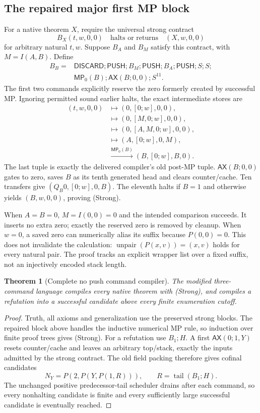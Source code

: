 \documentclass[11pt]{article}
\newcommand{\MP}{\mathsf{MP}_0}
\newcommand{\AX}{\mathsf{AX}}
\newcommand{\PUSH}{\mathsf{PUSH}}
\newcommand{\DISCARD}{\mathsf{DISCARD}}
\newtheorem{theorem}{Theorem}
\begin{document}
\subsection*{The repaired major first MP block}
For a native theorem $X$, require the universal strong contract
\[
 B_X(t,w,0,0)\quad\text{halts or returns}\quad(X,w,0,0)
 \tag{Strong}
\]
for arbitrary natural $t,w$. Suppose $B_A$ and $B_M$ satisfy this contract, with $M=I(A,B)$. Define
\[
 \begin{split}
 B_B={}&\DISCARD;\PUSH;B_M;\PUSH;B_A;\PUSH;S;S;\\
       &\MP(B);\AX(B;0,0);S^{11}.
 \end{split}
\]
The first two commands explicitly reserve the zero formerly created by successful MP. Ignoring permitted sound earlier halts, the exact intermediate stores are
\begin{align*}
 (t,w,0,0)&\longmapsto(0,[0;w],0,0),\\
 &\longmapsto(0,[M,0;w],0,0),\\
 &\longmapsto(0,[A,M,0;w],0,0),\\
 &\longmapsto(A,[0;w],0,M),\\
 &\xrightarrow{\MP(B)}(B,[0;w],B,0).
\end{align*}
The last tuple is exactly the delivered compiler's old post-MP tuple. $\AX(B;0,0)$ gates to zero, saves $B$ as its tenth generated head and clears counter/cache. Ten transfers give $(Q_B0,[0;w],0,B)$. The eleventh halts if $B=1$ and otherwise yields $(B,w,0,0)$, proving (Strong).

When $A=B=0$, $M=I(0,0)=0$ and the intended comparison succeeds. It inserts no extra zero; exactly the reserved zero is removed by cleanup. When $w=0$, a saved zero can numerically alias its suffix because $P(0,0)=0$. This does not invalidate the calculation: $\operatorname{unpair}(P(x,v))=(x,v)$ holds for every natural pair. The proof tracks an explicit wrapper list over a fixed suffix, not an injectively encoded stack length.

\begin{theorem}[Complete no push command compiler]
The modified three-command language compiles every native theorem with (Strong), and compiles a refutation into a successful candidate above every finite enumeration cutoff.
\end{theorem}
\begin{proof}
Truth, all axioms and generalization use the preserved strong blocks. The repaired block above handles the inductive numerical MP rule, so induction over finite proof trees gives (Strong). For a refutation use $B_1;H$. A first $\AX(0;1,Y)$ resets counter/cache and leaves an arbitrary top/stack, exactly the inputs admitted by the strong contract. The old field packing therefore gives cofinal candidates
\[
 N_Y=P(2,P(Y,P(1,R))),\qquad R=\operatorname{tail}(B_1;H).
\]
The unchanged positive predecessor-tail scheduler drains after each command, so every nonhalting candidate is finite and every sufficiently large successful candidate is eventually reached.
\end{proof}
\end{document}
